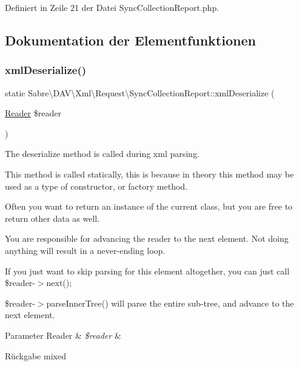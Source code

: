 Definiert in Zeile 21 der Datei Sync\+Collection\+Report.\+php.



\subsection{Dokumentation der Elementfunktionen}
\mbox{\label{class_sabre_1_1_d_a_v_1_1_xml_1_1_request_1_1_sync_collection_report_a79e383048fca9256a4208c3da137a971}} 
\subsubsection{\texorpdfstring{xml\+Deserialize()}{xmlDeserialize()}}
{\footnotesize\ttfamily static Sabre\textbackslash{}\+D\+A\+V\textbackslash{}\+Xml\textbackslash{}\+Request\textbackslash{}\+Sync\+Collection\+Report\+::xml\+Deserialize (\begin{DoxyParamCaption}\item[{\mbox{\hyperlink{class_sabre_1_1_xml_1_1_reader}{Reader}}}]{\$reader }\end{DoxyParamCaption})\hspace{0.3cm}{\ttfamily [static]}}

The deserialize method is called during xml parsing.

This method is called statically, this is because in theory this method may be used as a type of constructor, or factory method.

Often you want to return an instance of the current class, but you are free to return other data as well.

You are responsible for advancing the reader to the next element. Not doing anything will result in a never-\/ending loop.

If you just want to skip parsing for this element altogether, you can just call \$reader-\/$>$next();

\$reader-\/$>$parse\+Inner\+Tree() will parse the entire sub-\/tree, and advance to the next element.


\begin{DoxyParams}[1]{Parameter}
Reader & {\em \$reader} & \\
\hline
\end{DoxyParams}
\begin{DoxyReturn}{Rückgabe}
mixed 
\end{DoxyReturn}


